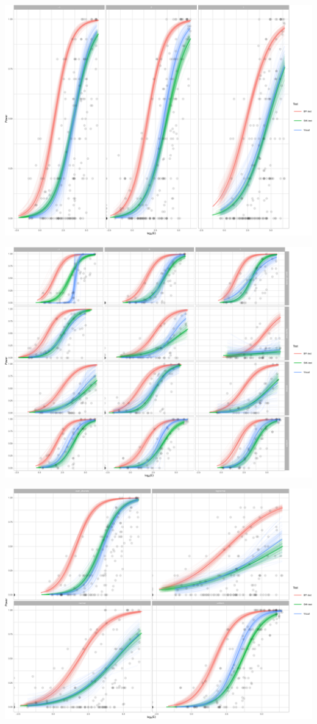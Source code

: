 \documentclass[]{interact}
\theoremstyle{plain}%
\theoremstyle{definition}
\theoremstyle{remark}
\begin{document}
\includegraphics[width=1\linewidth]{paper_comparison_files/figure-latex/unnamed-chunk-17-1}

\includegraphics[width=1\linewidth]{paper_comparison_files/figure-latex/unnamed-chunk-18-1}

\includegraphics[width=1\linewidth]{paper_comparison_files/figure-latex/unnamed-chunk-19-1}
\end{document}
